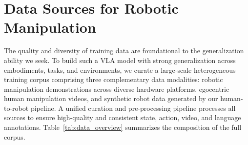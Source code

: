 \section{Data Sources for Robotic Manipulation}
\label{sec:data}

The quality and diversity of training data are foundational to the generalization ability we seek.
To build such a VLA model with strong generalization across embodiments, tasks, and environments, we curate a large-scale heterogeneous training corpus 
comprising three complementary data modalities: robotic manipulation demonstrations across diverse hardware platforms, egocentric human manipulation videos, and synthetic robot data generated by our human-to-robot pipeline.
A unified curation and pre-processing pipeline processes all sources to ensure high-quality and consistent state, action, video, and language annotations.
Table~\ref{tab:data_overview} summarizes the composition of the full corpus.


